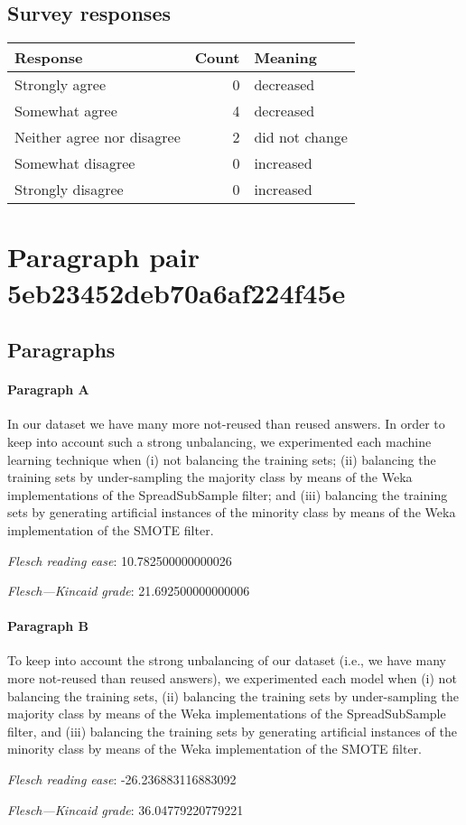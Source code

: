 \subsection{Survey responses}
\begin{tabular}{lrl}
\toprule
          \textbf{Response} &  \textbf{Count} & \textbf{Meaning} \\
\midrule
             Strongly agree &               0 &        decreased \\
             Somewhat agree &               4 &        decreased \\
 Neither agree nor disagree &               2 &   did not change \\
          Somewhat disagree &               0 &        increased \\
          Strongly disagree &               0 &        increased \\
\bottomrule
\end{tabular}

\section{Paragraph pair 5eb23452deb70a6af224f45e}
\subsection{Paragraphs}
\paragraph{Paragraph A}
In our dataset we have many more not-reused than reused answers. In order to keep into account such a strong unbalancing, we experimented each machine learning technique when (i) not balancing the training sets; (ii) balancing the training sets by under-sampling the majority class by means of the Weka implementations of the SpreadSubSample filter; and (iii) balancing the training sets by generating artificial instances of the minority class by means of the Weka implementation of the SMOTE filter.\par\medskip\emph{Flesch reading ease}: 10.782500000000026\par\emph{Flesch---Kincaid grade}: 21.692500000000006

\paragraph{Paragraph B}
To keep into account the strong unbalancing of our dataset (i.e., we have many more not-reused than reused answers), we experimented each model when (i) not balancing the training sets, (ii) balancing the training sets by under-sampling the majority class by means of the Weka implementations of the SpreadSubSample filter, and (iii) balancing the training sets by generating artificial instances of the minority class by means of the Weka implementation of the SMOTE filter.\par\medskip\emph{Flesch reading ease}: -26.236883116883092\par\emph{Flesch---Kincaid grade}: 36.04779220779221

